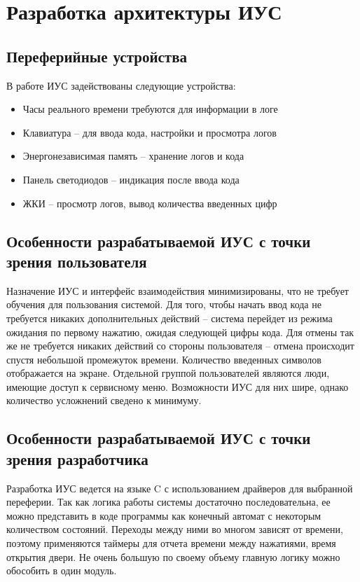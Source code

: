 \documentclass[12pt, a4paper] {article}
\begin{document}
\section{Разработка архитектуры ИУС}
\subsection{Переферийные устройства}
В работе ИУС задействованы следующие устройства:
\begin{itemize}
  \item Часы реального времени требуются для информации в логе
  \item Клавиатура -- для ввода кода, настройки и просмотра логов
  \item Энергонезависимая память -- хранение логов и кода
  \item Панель светодиодов -- индикация после ввода кода
  \item ЖКИ -- просмотр логов, вывод количества введенных цифр
\end{itemize}

\subsection{Особенности разрабатываемой ИУС с точки зрения пользователя}
Назначение ИУС и интерфейс взаимодействия минимизированы, что не требует
обучения для пользования системой. Для того, чтобы начать ввод кода не
требуется никаких дополнительных действий -- система перейдет из режима ожидания
по первому нажатию, ожидая следующей цифры кода. Для отмены так же не требуется
никаких действий со стороны пользователя -- отмена происходит спустя небольшой
промежуток времени. Количество введенных символов отображается на экране.
Отдельной группой пользователей являются люди, имеющие доступ к сервисному меню.
Возможности ИУС для них шире, однако количество усложнений сведено к минимуму.
\subsection{Особенности разрабатываемой ИУС с точки зрения разработчика}
Разработка ИУС ведется на языке C с использованием драйверов для выбранной
переферии. Так как логика работы системы достаточно последовательна, ее можно
представить в коде программы как конечный автомат с некоторым количеством
состояний. Переходы между ними во многом зависят от времени, поэтому применяются
таймеры для отчета времени между нажатиями, время открытия двери. Не очень
большую по своему объему главную логику можно обособить в один модуль.
\end{document}
